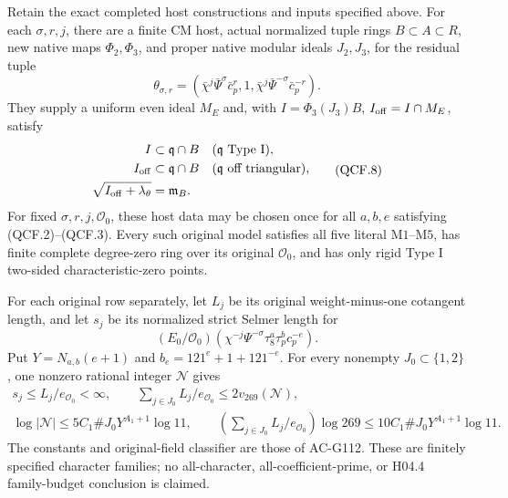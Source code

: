 \begin{theorem}
\label{AC-G139-families}
Retain the exact completed host constructions and inputs specified
above.  For each \(\sigma,r,j\), there are a finite CM host,
actual normalized tuple rings \(B\subset A\subset R\),
new native maps \(\Phi_2,\Phi_3\), and proper native modular
ideals \(J_2,J_3\), for the residual tuple
\[
 \theta_{\sigma,r}=
  (\bar\chi^j\bar\Psi^\sigma\bar c_p^r,
                  1,\bar\chi^j\bar\Psi^{-\sigma}\bar c_p^{-r}).
 \tag{QCF.7}
\]
They supply a uniform even ideal \(M_E\) and, with
\(I=\Phi_3(J_3)B\), \(I_{\rm off}=I\cap M_E\), satisfy
\[
 \begin{aligned}
 I&\subset\mathfrak q\cap B
                 &&(\mathfrak q\text{ Type I}),\\
 I_{\rm off}&\subset\mathfrak q\cap B
                 &&(\mathfrak q\text{ off triangular}),\\
 \sqrt{I_{\rm off}+\lambda_\theta}&=\mathfrak m_B.
 \end{aligned}
 \tag{QCF.8}
\]
For fixed \(\sigma,r,j,\mathcal O_0\), these host data may
be chosen once for all \(a,b,e\) satisfying (QCF.2)--(QCF.3).
Every such original model satisfies all five literal
\(\mathrm{M1}\)--\(\mathrm{M5}\), has finite complete degree-zero
ring over its original \(\mathcal O_0\), and has only rigid
Type I two-sided characteristic-zero points.

For each original row separately, let \(L_j\) be its original
weight-minus-one cotangent length, and let \(s_j\) be its
normalized strict Selmer length for
\[
       (E_0/\mathcal O_0)
        (\chi^{-j}\Psi^{-\sigma}\tau_8^a\tau_p^bc_p^{-e}).
 \tag{QCF.9}
\]
Put \(Y=N_{a,b}(e+1)\) and \(b_e=121^e+1+121^{-e}\).
For every nonempty \(J_0\subset\{1,2\}\), one nonzero rational
integer \(\mathcal N\) gives
\[
 \begin{gathered}
 s_j\le L_j/e_{\mathcal O_0}<\infty,\qquad
 \sum_{j\in J_0}L_j/e_{\mathcal O_0}\le2v_{269}(\mathcal N),\\
 \log|\mathcal N|\le5C_1\#J_0Y^{A_1+1}\log11,\qquad
 \left(\sum_{j\in J_0}L_j/e_{\mathcal O_0}\right)\log269
       \le10C_1\#J_0Y^{A_1+1}\log11.
\end{gathered}
 \tag{QCF.10}
\]
The constants and original-field classifier are those of AC-G112.
These are finitely specified character families; no all-character,
all-coefficient-prime, or H04.4 family-budget conclusion is claimed.
\end{theorem}

